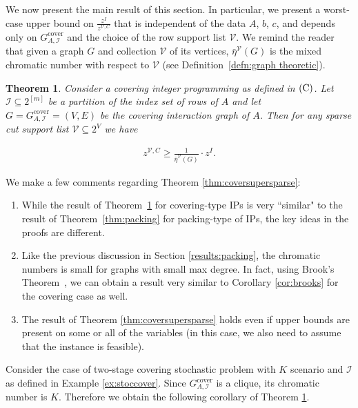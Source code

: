 \documentclass[smallextended]{svjour3}
\newtheorem{theorem}[proposition]{Theorem}
\begin{document}
We now present the main result of this section. In particular, we present a worst-case upper bound on $\frac{z^I}{z^{\mathcal{V}, C}}$ that is independent of the data $A$, $b$, $c$, and depends only on ${G^{\textrm{cover}}_{A, {\mathcal{I}}}}$ and the choice of the row support list $\mathcal{V}$. We remind the reader that given a graph $G$ and collection $\mathcal{V}$ of its vertices, $\bar{\eta}^{\mathcal{V}}(G)$ is the mixed chromatic number with respect to $\mathcal{V}$ (see Definition~\ref{defn:graph theoretic}).

\begin{theorem}\label{thrm:covering}
	Consider a covering integer programming as defined in $(\textup{C})$. Let ${\mathcal{I}} \subseteq 2^{[m]}$ be a partition of the index set of rows of $A$ and let $G = {G^{\textrm{cover}}_{A, {\mathcal{I}}}} = (V,E)$ be the covering interaction graph of $A$. Then for any sparse cut support list ${\mathcal{V}} \subseteq 2^V$ we have
	
	\begin{eqnarray*}
	z^{\mathcal{V}, C} \geq \frac{1}{\bar{\eta}^{\mathcal{V}}(G)}\cdot z^{I}.
	\end{eqnarray*}
\end{theorem}

We make a few comments regarding Theorem \ref{thm:coversupersparse}:
\begin{enumerate}
\item While the result of Theorem~\ref{thrm:covering} for covering-type IPs is very ``similar" to the result of Theorem~\ref{thm:packing} for packing-type of IPs, the key ideas in the proofs are different. 
\item Like the previous discussion in Section \ref{results:packing}, the chromatic numbers is small for graphs with small max degree. In fact, using Brook's Theorem~\cite{brooks41}, we can obtain a result very similar to Corollary \ref{cor:brooks} for the covering case as well. 
\item The result of Theorem \ref{thm:coversupersparse} holds even if upper bounds are present on some or all of the variables (in this case, we also need to assume that the instance is feasible). 
\end{enumerate}

Consider the case of two-stage covering stochastic problem with $K$ scenario and $\mathcal{I}$ as defined in Example \ref{ex:stoccover}. Since ${G^{\textrm{cover}}_{A, {\mathcal{I}}}}$ is a clique, its chromatic number is $K$. Therefore we obtain the following corollary of Theorem \ref{thrm:covering}.
\end{document}
